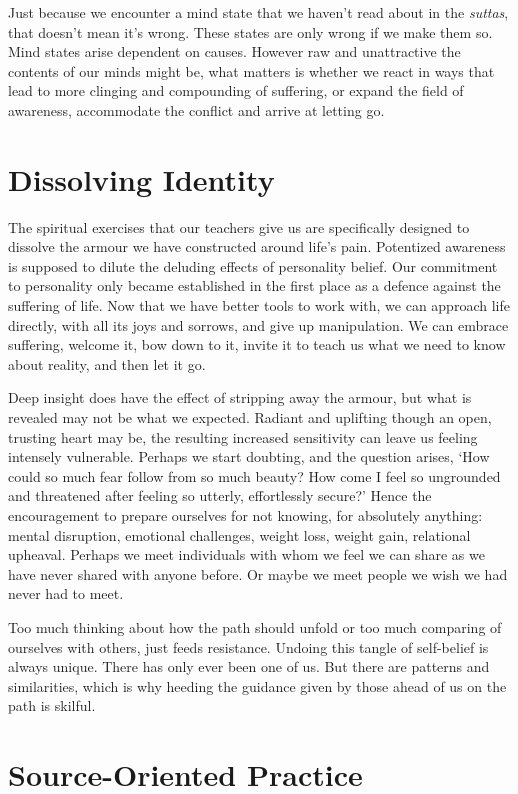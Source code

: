 Just because we encounter a mind state that we haven’t read about in the
\emph{suttas}, that doesn’t mean it’s wrong. These states are only wrong if
we make them so. Mind states arise dependent on causes. However raw and
unattractive the contents of our minds might be, what matters is whether
we react in ways that lead to more clinging and compounding of
suffering, or expand the field of awareness, accommodate the conflict
and arrive at letting go.

\section{Dissolving Identity}

The spiritual exercises that our teachers give us are specifically
designed to dissolve the armour we have constructed around life’s pain.
Potentized awareness is supposed to dilute the deluding effects of
personality belief. Our commitment to personality only became
established in the first place as a defence against the suffering of
life. Now that we have better tools to work with, we can approach life
directly, with all its joys and sorrows, and give up manipulation. We
can embrace suffering, welcome it, bow down to it, invite it to teach us
what we need to know about reality, and then let it go.

Deep insight does have the effect of stripping away the armour, but what
is revealed may not be what we expected. Radiant and uplifting though an
open, trusting heart may be, the resulting increased sensitivity can
leave us feeling intensely vulnerable. Perhaps we start doubting, and
the question arises, ‘How could so much fear follow from so much beauty?
How come I feel so ungrounded and threatened after feeling so utterly,
effortlessly secure?’ Hence the encouragement to prepare ourselves for
not knowing, for absolutely anything: mental disruption, emotional
challenges, weight loss, weight gain, relational upheaval. Perhaps we
meet individuals with whom we feel we can share as we have never shared
with anyone before. Or maybe we meet people we wish we had never had to
meet.

Too much thinking about how the path should unfold or too much comparing
of ourselves with others, just feeds resistance. Undoing this tangle of
self-belief is always unique. There has only ever been one of us. But
there are patterns and similarities, which is why heeding the guidance
given by those ahead of us on the path is skilful.

\section{Source-Oriented Practice}

